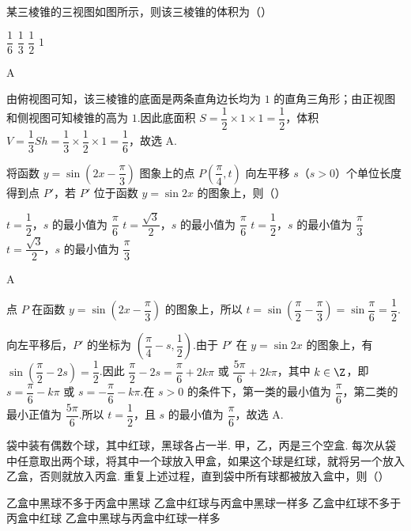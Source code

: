 \begin{problem}
某三棱锥的三视图如图所示，则该三棱锥的体积为（\quad）

\begingroup
{}
\endgroup

\choices
    {\(\dfrac16\)}
    {\(\dfrac13\)}
    {\(\dfrac12\)}
    {\(1\)}
\end{problem}

\begin{answer}
A
\end{answer}

\begin{solution}
由俯视图可知，该三棱锥的底面是两条直角边长均为 \(1\) 的直角三角形；由正视图和侧视图可知棱锥的高为 \(1\).因此底面积
\(S=\dfrac12\times1\times1=\dfrac12\)，体积
\(V=\dfrac13Sh=\dfrac13\times\dfrac12\times1=\dfrac16\)，故选 A.
\end{solution}

\begin{problem}
将函数 \(y=\sin\left(2x-\dfrac{\pi}{3}\right)\) 图象上的点 \(P\left(\dfrac{\pi}{4},t\right)\) 向左平移 \(s\)（\(s>0\)）个单位长度得到点 \(P'\)，若 \(P'\) 位于函数 \(y=\sin2x\) 的图象上，则（\quad）

\choices
    {\(t=\dfrac12\)，\(s\) 的最小值为 \(\dfrac{\pi}{6}\)}
    {\(t=\dfrac{\sqrt3}{2}\)，\(s\) 的最小值为 \(\dfrac{\pi}{6}\)}
    {\(t=\dfrac12\)，\(s\) 的最小值为 \(\dfrac{\pi}{3}\)}
    {\(t=\dfrac{\sqrt3}{2}\)，\(s\) 的最小值为 \(\dfrac{\pi}{3}\)}
\end{problem}

\begin{answer}
A
\end{answer}

\begin{solution}
点 \(P\) 在函数 \(y=\sin\left(2x-\dfrac\pi3\right)\) 的图象上，所以
\(t=\sin\left(\dfrac\pi2-\dfrac\pi3\right)=\sin\dfrac\pi6=\dfrac12\).

向左平移后，\(P'\) 的坐标为 \(\left(\dfrac\pi4-s,\dfrac12\right)\).由于 \(P'\) 在 \(y=\sin2x\) 的图象上，有
\(\sin\left(\dfrac\pi2-2s\right)=\dfrac12\).因此
\(\dfrac\pi2-2s=\dfrac\pi6+2k\pi\) 或 \(\dfrac{5\pi}6+2k\pi\)，其中 \(k\in\Z\)，即
\(s=\dfrac\pi6-k\pi\) 或 \(s=-\dfrac\pi6-k\pi\).在 \(s>0\) 的条件下，第一类的最小值为 \(\dfrac\pi6\)，第二类的最小正值为 \(\dfrac{5\pi}6\).所以 \(t=\dfrac12\)，且 \(s\) 的最小值为 \(\dfrac\pi6\)，故选 A.
\end{solution}

\begin{problem}
袋中装有偶数个球，其中红球，黑球各占一半. 甲，乙，丙是三个空盒. 每次从袋中任意取出两个球，将其中一个球放入甲盒，如果这个球是红球，就将另一个放入乙盒，否则就放入丙盒. 重复上述过程，直到袋中所有球都被放入盒中，则（\quad）

\choices
    {乙盒中黑球不多于丙盒中黑球}
    {乙盒中红球与丙盒中黑球一样多}
    {乙盒中红球不多于丙盒中红球}
    {乙盒中黑球与丙盒中红球一样多}
\end{problem}

